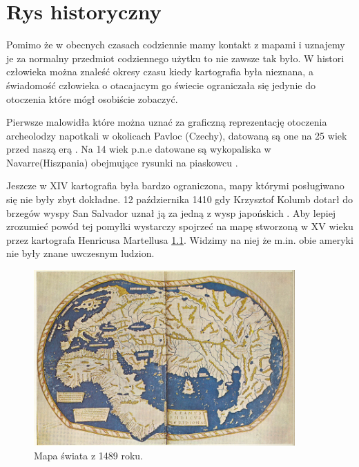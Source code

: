 
\chapter{Rys historyczny}
\label{sec:hisotryMap}

Pomimo że w obecnych czasach codziennie mamy kontakt z mapami i uznajemy je za normalny przedmiot codziennego użytku to nie zawsze tak było. W histori człowieka można znaleść okresy czasu kiedy kartografia była nieznana, a świadomość człowieka o otacajacym go świecie ograniczała się jedynie do otoczenia które mógł osobiście zobaczyć.

Pierwsze malowidła które można uznać za graficzną reprezentację otoczenia archeolodzy napotkali w okolicach Pavloc (Czechy), datowaną są one na 25 wiek przed naszą erą \cite{pre2} . Na 14 wiek p.n.e datowane są wykopaliska w Navarre(Hiszpania) obejmujące rysunki na piaskowcu \cite{pre1}.

Jeszcze w XIV kartografia była bardzo ograniczona, mapy którymi posługiwano się nie były zbyt dokładne. 12 października 1410 gdy Krzysztof Kolumb dotarł do brzegów wyspy San Salvador uznał ją za jedną z wysp japońskich \cite{columb}. Aby lepiej zrozumieć powód tej pomyłki wystarczy spojrzeć na mapę stworzoną w XV wieku przez kartografa Henricusa Martellusa \ref{fig:worldMap1}. Widzimy na niej że m.in. obie ameryki nie były znane uwczesnym ludzion.

\begin{figure}[H]
  \centering
    \includegraphics[width=100mm]{ge/worldMap1.jpg}
  \caption{Mapa świata z 1489 roku.}
  \label{fig:worldMap1}
\end{figure}
